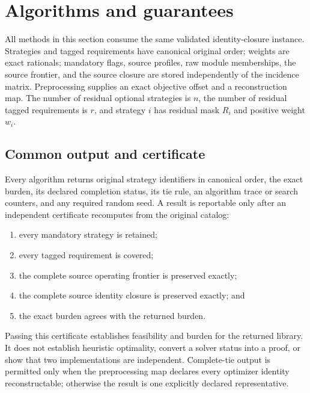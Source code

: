\section{Algorithms and guarantees}
\label{sec:algorithms}

All methods in this section consume the same validated
identity-closure instance.  Strategies and tagged requirements have canonical
original order; weights are exact rationals; mandatory flags, source profiles,
raw module memberships, the source frontier, and the source closure are stored
independently of the incidence matrix.  Preprocessing supplies an exact
objective offset and a reconstruction map.  The number of residual optional
strategies is \(n\), the number of residual tagged requirements is \(r\), and
strategy \(i\) has residual mask \(R_i\) and positive weight \(w_i\).

\begin{center}
\end{center}

\subsection{Common output and certificate}
\label{subsec:aor-common-certificate}

Every algorithm returns original strategy identifiers in canonical order, the
exact burden, its declared completion status, its tie rule, an algorithm trace
or search counters, and any required random seed.  A result is reportable only
after an independent certificate recomputes from the original catalog:
\begin{enumerate}
 \item every mandatory strategy is retained;
 \item every tagged requirement is covered;
 \item the complete source operating frontier is preserved exactly;
 \item the complete source identity closure is preserved exactly; and
 \item the exact burden agrees with the returned burden.
\end{enumerate}
Passing this certificate establishes feasibility and burden for the returned
library.  It does not establish heuristic optimality, convert a solver status
into a proof, or show that two implementations are independent.  Complete-tie
output is permitted only when the preprocessing map declares every optimizer
identity reconstructable; otherwise the result is one explicitly declared
representative.

